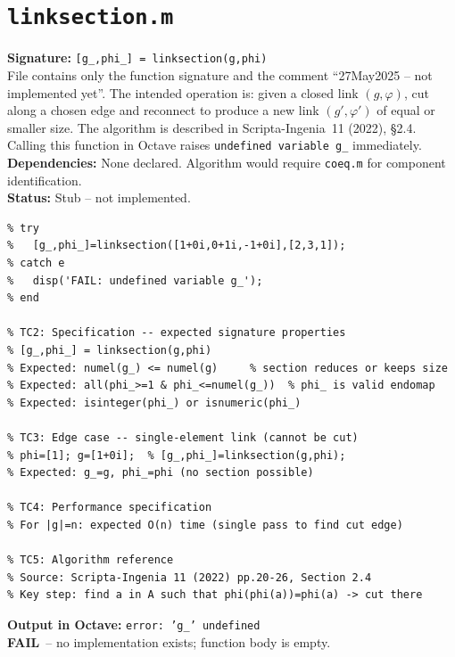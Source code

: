 \documentclass[12pt,a4paper]{report}
\newcommand{\mf}[1]{\texttt{#1}}
\newcommand{\FAIL}{\textcolor{red!70!black}{\textbf{FAIL}}}
\begin{document}
\chapter{\mf{linksection.m}}
\begin{tcolorbox}[Abox,title=Analysis]
\textbf{Signature:} \lstinline|[g_,phi_] = linksection(g,phi)|\\
File contains only the function signature and the comment ``27May2025 -- not implemented yet''. The intended operation is: given a closed link $(g,\varphi)$, cut along a chosen edge and reconnect to produce a new link $(g',\varphi')$ of equal or smaller size. The algorithm is described in Scripta-Ingenia~11 (2022), \S2.4. Calling this function in Octave raises \texttt{undefined variable g\_} immediately.\\[4pt]
\textbf{Dependencies:} None declared. Algorithm would require \mf{coeq.m} for component identification.\\[4pt]
\textbf{Status:} Stub -- not implemented.
\end{tcolorbox}
\begin{lstlisting}[caption={Tests for linksection.m (static analysis + specification)}]
% TC1: Call raises error in Octave (static analysis confirmed)
% try
%   [g_,phi_]=linksection([1+0i,0+1i,-1+0i],[2,3,1]);
% catch e
%   disp('FAIL: undefined variable g_');
% end

% TC2: Specification -- expected signature properties
% [g_,phi_] = linksection(g,phi)
% Expected: numel(g_) <= numel(g)     % section reduces or keeps size
% Expected: all(phi_>=1 & phi_<=numel(g_))  % phi_ is valid endomap
% Expected: isinteger(phi_) or isnumeric(phi_)

% TC3: Edge case -- single-element link (cannot be cut)
% phi=[1]; g=[1+0i];  % [g_,phi_]=linksection(g,phi);
% Expected: g_=g, phi_=phi (no section possible)

% TC4: Performance specification
% For |g|=n: expected O(n) time (single pass to find cut edge)

% TC5: Algorithm reference
% Source: Scripta-Ingenia 11 (2022) pp.20-26, Section 2.4
% Key step: find a in A such that phi(phi(a))=phi(a) -> cut there
\end{lstlisting}
\begin{tcolorbox}[Fbox,title=TC1 -- Calling raises runtime error]
\textbf{Output in Octave:} \texttt{error: 'g\_' undefined}\\
\FAIL\ -- no implementation exists; function body is empty.
\end{tcolorbox}
\end{document}
